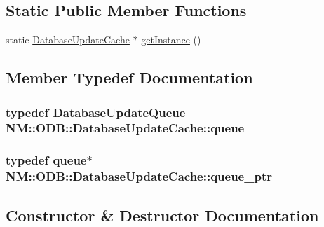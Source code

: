 \subsection*{Static Public Member Functions}
\begin{DoxyCompactItemize}
\item 
static \hyperlink{class_n_m_1_1_o_d_b_1_1_database_update_cache}{Database\+Update\+Cache} $\ast$ \hyperlink{class_n_m_1_1_o_d_b_1_1_database_update_cache_a5fa9e7ca0980ec0a8f3a275a45d6c32d}{get\+Instance} ()
\end{DoxyCompactItemize}


\subsection{Member Typedef Documentation}
\hypertarget{class_n_m_1_1_o_d_b_1_1_database_update_cache_a3276437d24ef54dd3d31e2c27f34e84a}{}
\subsubsection[{queue}]{\setlength{\rightskip}{0pt plus 5cm}typedef {\bf Database\+Update\+Queue} {\bf N\+M\+::\+O\+D\+B\+::\+Database\+Update\+Cache\+::queue}}\label{class_n_m_1_1_o_d_b_1_1_database_update_cache_a3276437d24ef54dd3d31e2c27f34e84a}
\hypertarget{class_n_m_1_1_o_d_b_1_1_database_update_cache_ae031bccefd897ef3c1d44a4e6c7ca99c}{}
\subsubsection[{queue\+\_\+ptr}]{\setlength{\rightskip}{0pt plus 5cm}typedef {\bf queue}$\ast$ {\bf N\+M\+::\+O\+D\+B\+::\+Database\+Update\+Cache\+::queue\+\_\+ptr}}\label{class_n_m_1_1_o_d_b_1_1_database_update_cache_ae031bccefd897ef3c1d44a4e6c7ca99c}


\subsection{Constructor \& Destructor Documentation}
\hypertarget{class_n_m_1_1_o_d_b_1_1_database_update_cache_af064cf7160af5df46ebdd80d3df71434}{}
